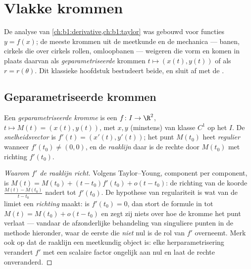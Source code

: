 \chapter{Vlakke krommen}\label{ch:b1:curves}

De analyse van \cref{ch:b1:derivative,ch:b1:taylor} was gebouwd voor
functies $y = f(x)$; de meeste krommen uit de meetkunde en de
mechanica --- banen, cirkels die over cirkels rollen, omloopbanen
--- weigeren die vorm en komen in plaats daarvan als
\emph{geparametriseerde} krommen $t \mapsto (x(t), y(t))$ of als
\emph{} $r = r(\theta)$. Dit klassieke hoofdstuk
bestudeert beide, en sluit af met de .

\section{Geparametriseerde krommen}

\begin{definition}\label{def:b1:curves:def}
Een \emph{geparametriseerde kromme}
is een  $f \colon I \to \R^2$, $t \mapsto M(t) = (x(t),
y(t))$, met $x, y$ (minstens) van klasse $C^1$ op het  $I$.
De \emph{snelheidsvector} is $f'(t) = (x'(t), y'(t))$; het punt
$M(t_0)$ heet \emph{regulier} wanneer $f'(t_0) \neq (0,0)$, en de
\emph{raaklijn} daar is de rechte door $M(t_0)$ met richting
$f'(t_0)$.
\end{definition}

\begin{proof}[Waarom $f'$ de raaklijn richt]
Volgens Taylor--Young, component per component, is $M(t) = M(t_0) +
(t - t_0) f'(t_0) + o(t - t_0)$: de richting van de koorde
$\frac{M(t) - M(t_0)}{t - t_0}$ nadert tot $f'(t_0)$. De hypothese
van regulariteit is wat van de limiet een \emph{richting} maakt: is
$f'(t_0) = 0$, dan stort de formule in tot $M(t) = M(t_0) + o(t -
t_0)$ en zegt zij niets over hoe de kromme het punt verlaat ---
vandaar de afzonderlijke behandeling van singuliere punten in de
methode hieronder, waar de eerste  die \emph{niet} nul is
de rol van $f'$ overneemt. Merk ook op dat de raaklijn een
meetkundig object is: elke herparametrisering verandert $f'$ met
een scalaire factor ongelijk aan nul en laat de rechte
onveranderd.
\end{proof}

